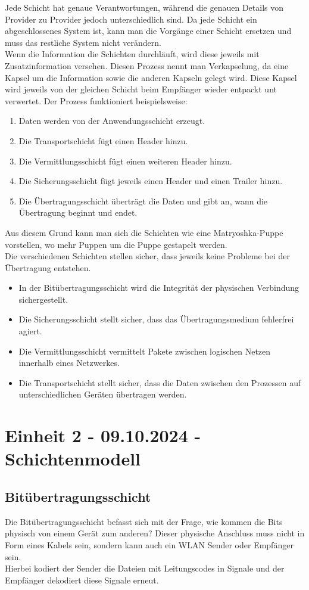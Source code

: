 \documentclass{article}
\begin{document}
	 Jede Schicht hat genaue Verantwortungen, während die genauen Details von Provider zu Provider jedoch unterschiedlich sind. Da jede Schicht ein abgeschlossenes System ist, kann man die Vorgänge einer Schicht ersetzen und muss das restliche System nicht verändern. \\
	 Wenn die Information die Schichten durchläuft, wird diese jeweils mit Zusatzinformation versehen. Diesen Prozess nennt man Verkapselung, da eine Kapsel um die Information sowie die anderen Kapseln gelegt wird. Diese Kapsel wird jeweils von der gleichen Schicht beim Empfänger wieder entpackt unt verwertet. Der Prozess funktioniert beispielsweise:
	 \begin{enumerate}
	 	\item{Daten werden von der Anwendungsschicht erzeugt.}
	 	\item{Die Transportschicht fügt einen Header hinzu.}
	 	\item{Die Vermittlungsschicht fügt einen weiteren Header hinzu.}
	 	\item{Die Sicherungsschicht fügt jeweils einen Header und einen Trailer hinzu.}
	 	\item{Die Übertragungsschicht überträgt die Daten und gibt an, wann die Übertragung beginnt und endet.}
	 \end{enumerate}
	 Aus diesem Grund kann man sich die Schichten wie eine Matryoshka-Puppe vorstellen, wo mehr Puppen um die Puppe gestapelt werden. \\
	 Die verschiedenen Schichten stellen sicher, dass jeweils keine Probleme bei der Übertragung entstehen.
	 \begin{itemize}
	 	\item{In der Bitübertragungsschicht wird die Integrität der physischen Verbindung sichergestellt.}
	 	\item{Die Sicherungsschicht stellt sicher, dass das Übertragungsmedium fehlerfrei agiert.}
	 	\item{Die Vermittlungsschicht vermittelt Pakete zwischen logischen Netzen innerhalb eines Netzwerkes.}
	 	\item{Die Transportschicht stellt sicher, dass die Daten zwischen den Prozessen auf unterschiedlichen Geräten übertragen werden.}
	 \end{itemize}
	 \section{Einheit 2 - 09.10.2024 - Schichtenmodell}
	 \subsection{Bitübertragungsschicht}
	 Die Bitübertragungsschicht befasst sich mit der Frage, wie kommen die Bits physisch von einem Gerät zum anderen? Dieser physische Anschluss muss nicht in Form eines Kabels sein, sondern kann auch ein WLAN Sender oder Empfänger sein. \\
	 Hierbei kodiert der Sender die Dateien mit Leitungscodes in Signale und der Empfänger dekodiert diese Signale erneut. \\
\end{document}
